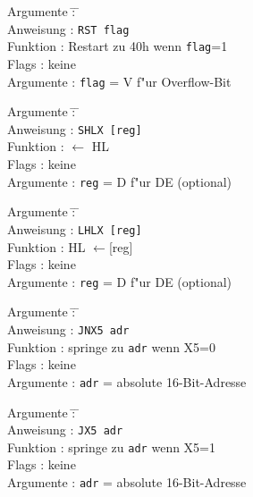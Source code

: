 \documentclass[12pt,a4paper,twoside]{report}
\newcommand{\tty}[1]{{\tt #1}}
\begin{document}
\begin{tabbing}
Argumente         \= : \= \kill \\
Anweisung         \> : \> \tty{RST flag} \\
Funktion          \> : \> Restart zu 40h wenn {\tt flag}=1 \\
Flags             \> : \> keine \\
Argumente         \> : \> {\tt flag} = V f"ur Overflow-Bit \\
\end{tabbing}

\begin{tabbing}
Argumente         \= : \= \kill \\
Anweisung         \> : \> \tty{SHLX [reg]} \\
Funktion          \> : \> [reg] $\leftarrow$ HL \\
Flags             \> : \> keine \\
Argumente         \> : \> \tty{reg} = D f"ur DE (optional) \\
\end{tabbing}

\begin{tabbing}
Argumente         \= : \= \kill \\
Anweisung         \> : \> \tty{LHLX [reg]} \\
Funktion          \> : \> HL $\leftarrow$[reg] \\
Flags             \> : \> keine \\
Argumente         \> : \> \tty{reg} = D f"ur DE (optional) \\
\end{tabbing}

\begin{tabbing}
Argumente         \= : \= \kill \\
Anweisung         \> : \> \tty{JNX5 adr} \\
Funktion          \> : \> springe zu {\tt adr} wenn X5=0 \\
Flags             \> : \> keine \\
Argumente         \> : \> {\tt adr} = absolute 16-Bit-Adresse \\
\end{tabbing}

\begin{tabbing}
Argumente         \= : \= \kill \\
Anweisung         \> : \> \tty{JX5 adr} \\
Funktion          \> : \> springe zu {\tt adr} wenn X5=1 \\
Flags             \> : \> keine \\
Argumente         \> : \> {\tt adr} = absolute 16-Bit-Adresse \\
\end{tabbing}
\end{document}
